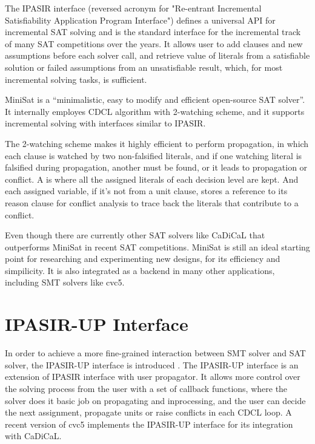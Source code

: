 The IPASIR interface (reversed acronym for "Re-entrant Incremental Satisfiability Application Program Interface") defines a universal API for incremental SAT solving and is the standard interface for the incremental track of many SAT competitions over the years. \cite{BALYO201645} It allows user to add clauses and new assumptions before each solver call, and retrieve value of literals from a satisfiable solution or failed assumptions from an unsatisfiable result, which, for most incremental solving tasks, is sufficient.

MiniSat is a ``minimalistic, easy to modify and efficient open-source SAT solver''. It internally employes CDCL algorithm with 2-watching scheme, and it supports incremental solving with interfaces similar to IPASIR.

The 2-watching scheme makes it highly efficient to perform propagation, in which each clause is watched by two non-falsified literals, and if one watching literal is falsified during propagation, another must be found, or it leads to propagation or conflict. A  is where all the assigned literals of each decision level are kept. And each assigned variable, if it's not from a unit clause, stores a reference to its reason clause for conflict analysis to trace back the literals that contribute to a conflict.

Even though there are currently other SAT solvers like CaDiCaL that outperforms MiniSat in recent SAT competitions. MiniSat is still an ideal starting point for researching and experimenting new designs, for its efficiency and simpilicity. It is also integrated as a backend in many other applications, including SMT solvers like cvc5.

\section{IPASIR-UP Interface}

In order to achieve a more fine-grained interaction between SMT solver and SAT solver, the IPASIR-UP interface is introduced \cite{fazekas_et_al:LIPIcs.SAT.2023.8}. The IPASIR-UP interface is an extension of IPASIR interface with user propagator. It allows more control over the solving process from the user with a set of callback functions, where the solver does it basic job on propagating and inprocessing, and the user can decide the next assignment, propagate units or raise conflicts in each CDCL loop. A recent version of cvc5 implements the IPASIR-UP interface for its integration with CaDiCaL.

